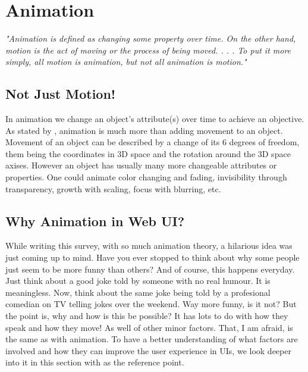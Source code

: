 %
%
% 
% 
% 


\chapter{Animation}

\label{chap:Animation}

{\em"Animation is defined as changing some property over time. On the other 
hand, motion is the act of moving or the process of being moved. . . .  To put 
it more simply, all motion is animation, but not all animation is 
motion."}\citep{head2016designing}

\section{Not Just Motion!} %
\label{sec:anime_motion}

In animation we change an object’s attribute(s) over time to achieve an 
objective. As stated by \citet{head2016designing}, animation is much more than 
adding movement to an object. Movement of an object can be described by a 
change of its 6 degrees of freedom, them being the coordinates in 3D space and 
the rotation around the 3D space axises. However an object has usually many 
more changeable attributes or properties. One could animate color changing and 
fading, invisibility through transparency, growth with scaling, focus with 
blurring, etc.

\section{Why Animation in Web UI?} %
\label{sec:anime_why}

While writing this survey, with so much animation theory, a hilarious idea was 
just coming up to mind. Have you ever stopped to think about why some people 
just seem to be more funny than others? And of course, this happens everyday. 
Just think about a good joke told by someone with no real humour. It is 
meaningless. Now, think about the same joke being told by a profesional 
comedian on TV telling jokes over the weekend. Way more funny, is it not? But 
the point is, why and how is this be possible?
It has lots to do with how they speak and how they move! As well of other minor 
factors. That, I am afraid, is the same as with animation. To have a better 
understanding of what factors are involved and how they can improve the user 
experience in UIs, we look deeper into it in this section with 
\citet{head2016designing} as the reference point.

